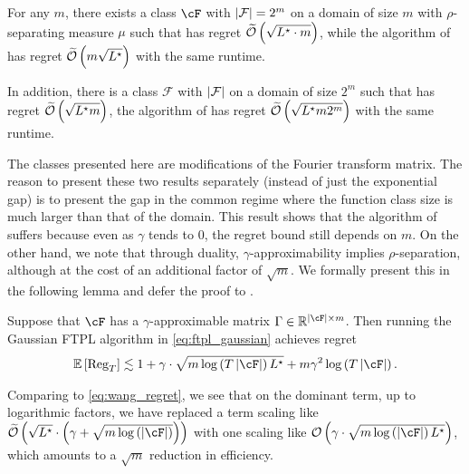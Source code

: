 \begin{proposition} \label{prop:hadamard_gap}
    For any $m$, there exists a class  $\cF$ with $\left| \mathcal{F} \right| = 2^m$ on a domain of size $m$ with $\rho$-separating measure $\mu$ such that  has regret $\widetilde{\mathcal{O}}\left( \sqrt{ L^\star \cdot m } \right)$, while the algorithm of \citet{wang2022adaptive} has regret $\widetilde{\mathcal{O}}\left( m \sqrt{ L^\star } \right)$ with the same runtime.
    
    In addition, there is a class $\mathcal{F}$ with $\left| \mathcal{F} \right|$ on a domain of size $2^m$ such that  has regret $\widetilde{\mathcal{O}}\left( \sqrt{ L^\star m } \right)$,  the algorithm of \citet{wang2022adaptive} has regret $\widetilde{\mathcal{O}}\left(  \sqrt{ L^\star m 2^m } \right)$ with the same runtime.
\end{proposition}
    The classes presented here are modifications of the Fourier transform matrix. 
    The reason to present these two results separately (instead of just the exponential gap) is to present the gap in the common regime where the function class size is much larger than that of the domain. This result shows that the algorithm of \citet{wang2022adaptive} suffers because even as $\gamma$ tends to 0, the regret bound still depends on $m$. 
    On the other hand, we note that through duality, $\gamma$-approximability implies $\rho$-separation, although at the cost of an additional factor of $\sqrt{m}$.
We formally present this in the following lemma and defer the proof to . 

\begin{corollary}\label{cor:gamma_approx}
    Suppose that $\cF$ has a $\gamma$-approximable matrix $\Gamma \in \rr^{\abs{\cF} \times m}$.  Then running the Gaussian FTPL algorithm in \eqref{eq:ftpl_gaussian} achieves regret
    \begin{align}
        \ee\left[ \reg_T \right] \lesssim 1 + \gamma \cdot \sqrt{m \log\left( T \abs{\cF} \right) \Lstar} + m \gamma^2 \log\left( T \abs{\cF} \right).
    \end{align}
\end{corollary}



Comparing  to \eqref{eq:wang_regret}, we see that on the dominant term, up to logarithmic factors, we have replaced a term scaling like $\bigOtil\left( \sqrt{\Lstar} \cdot \left( \gamma + \sqrt{m \log\left( \abs{\cF} \right)} \right) \right)$ with one scaling like $\bigO\left( \gamma \cdot \sqrt{m \log\left( \abs{\cF} \right) \Lstar} \right)$, which amounts to a $\sqrt{m}$ reduction in efficiency.  


